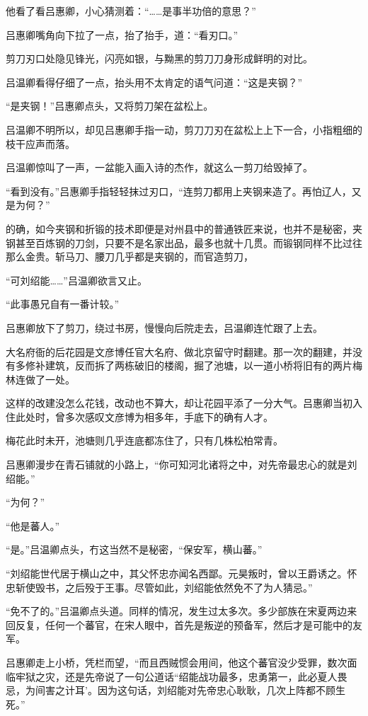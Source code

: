 他看了看吕惠卿，小心猜测着：“……是事半功倍的意思？”

吕惠卿嘴角向下拉了一点，抬了抬手，道：“看刃口。”

剪刀刃口处隐见锋光，闪亮如银，与黝黑的剪刀刀身形成鲜明的对比。

吕温卿看得仔细了一点，抬头用不太肯定的语气问道：“这是夹钢？”

“是夹钢！”吕惠卿点头，又将剪刀架在盆松上。

吕温卿不明所以，却见吕惠卿手指一动，剪刀刀刃在盆松上上下一合，小指粗细的枝干应声而落。

吕温卿惊叫了一声，一盆能入画入诗的杰作，就这么一剪刀给毁掉了。

“看到没有。”吕惠卿手指轻轻抹过刃口，“连剪刀都用上夹钢来造了。再怕辽人，又是为何？”

的确，如今夹钢和折锻的技术即便是对州县中的普通铁匠来说，也并不是秘密，夹钢甚至百炼钢的刀剑，只要不是名家出品，最多也就十几贯。而锻钢同样不比过往那么金贵。斩马刀、腰刀几乎都是夹钢的，而官造剪刀，

“可刘绍能……”吕温卿欲言又止。

“此事愚兄自有一番计较。”

吕惠卿放下了剪刀，绕过书房，慢慢向后院走去，吕温卿连忙跟了上去。

大名府衙的后花园是文彦博任官大名府、做北京留守时翻建。那一次的翻建，并没有多修补建筑，反而拆了两栋破旧的楼阁，掘了池塘，以一道小桥将旧有的两片梅林连做了一处。

这样的改建没怎么花钱，改动也不算大，却让花园平添了一分大气。吕惠卿当初入住此处时，曾多次感叹文彦博为相多年，手底下的确有人才。

梅花此时未开，池塘则几乎连底都冻住了，只有几株松柏常青。

吕惠卿漫步在青石铺就的小路上，“你可知河北诸将之中，对先帝最忠心的就是刘绍能。”

“为何？”

“他是蕃人。”

“是。”吕温卿点头，冇这当然不是秘密，“保安军，横山蕃。”

“刘绍能世代居于横山之中，其父怀忠亦闻名西鄙。元昊叛时，曾以王爵诱之。怀忠斩使毁书，之后殁于王事。尽管如此，刘绍能依然免不了为人猜忌。”

“免不了的。”吕温卿点头道。同样的情况，发生过太多次。多少部族在宋夏两边来回反复，任何一个蕃官，在宋人眼中，首先是叛逆的预备军，然后才是可能中的友军。

吕惠卿走上小桥，凭栏而望，“而且西贼惯会用间，他这个蕃官没少受罪，数次面临牢狱之灾，还是先帝说了一句公道话“绍能战功最多，忠勇第一，此必夏人畏忌，为间害之计耳’。因为这句话，刘绍能对先帝忠心耿耿，几次上阵都不顾生死。”

